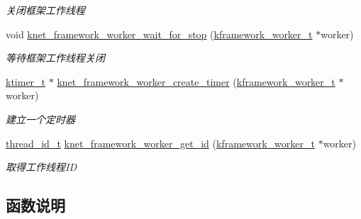 \begin{DoxyCompactItemize}
\begin{DoxyCompactList}\small\item\em 关闭框架工作线程 \end{DoxyCompactList}\item 
void \hyperlink{a00063_a74b264bfdb937045c6e1d72e12603403_a74b264bfdb937045c6e1d72e12603403}{knet\+\_\+framework\+\_\+worker\+\_\+wait\+\_\+for\+\_\+stop} (\hyperlink{a00053_af2a7f5b8406de73682f8bd4c2afee783_af2a7f5b8406de73682f8bd4c2afee783}{kframework\+\_\+worker\+\_\+t} $\ast$worker)
\begin{DoxyCompactList}\small\item\em 等待框架工作线程关闭 \end{DoxyCompactList}\item 
\hyperlink{a00053_a846172ea4e8a86449eca41a3d8e074b7_a846172ea4e8a86449eca41a3d8e074b7}{ktimer\+\_\+t} $\ast$ \hyperlink{a00063_a0599b3e991b6545e3070aa8414b9c0f3_a0599b3e991b6545e3070aa8414b9c0f3}{knet\+\_\+framework\+\_\+worker\+\_\+create\+\_\+timer} (\hyperlink{a00053_af2a7f5b8406de73682f8bd4c2afee783_af2a7f5b8406de73682f8bd4c2afee783}{kframework\+\_\+worker\+\_\+t} $\ast$worker)
\begin{DoxyCompactList}\small\item\em 建立一个定时器 \end{DoxyCompactList}\item 
\hyperlink{a00053_ad0ada5642d10ce71bdd90816182f9b79_ad0ada5642d10ce71bdd90816182f9b79}{thread\+\_\+id\+\_\+t} \hyperlink{a00063_a9697af110fe414bbf4031b3e06528b02_a9697af110fe414bbf4031b3e06528b02}{knet\+\_\+framework\+\_\+worker\+\_\+get\+\_\+id} (\hyperlink{a00053_af2a7f5b8406de73682f8bd4c2afee783_af2a7f5b8406de73682f8bd4c2afee783}{kframework\+\_\+worker\+\_\+t} $\ast$worker)
\begin{DoxyCompactList}\small\item\em 取得工作线程\+I\+D \end{DoxyCompactList}\end{DoxyCompactItemize}


\subsection{函数说明}
\hypertarget{a00063_a032b3c34db5de1a62a8bcf5ca9ebe1f8_a032b3c34db5de1a62a8bcf5ca9ebe1f8}{}
